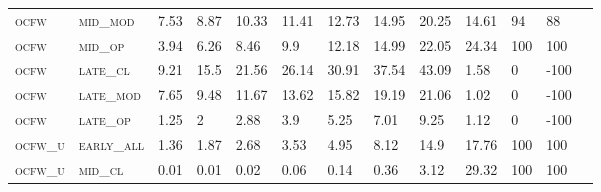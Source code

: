 \begin{sidewaystable}[!htbp]
\begin{tabular}{@{}lllllllllllll@{}}
\footnotesize \textsc{ocfw}        & \footnotesize \textsc{mid\_mod  }                & \footnotesize 7.53            & \footnotesize 8.87            & \footnotesize 10.33            & \footnotesize 11.41            & \footnotesize 12.73            & \footnotesize 14.95            & \footnotesize 20.25      & \footnotesize 14.61    & \footnotesize 94     & \footnotesize 88       \\
\footnotesize \textsc{ocfw}        & \footnotesize \textsc{mid\_op   }                & \footnotesize 3.94            & \footnotesize 6.26            & \footnotesize 8.46             & \footnotesize 9.9              & \footnotesize 12.18            & \footnotesize 14.99            & \footnotesize 22.05      & \footnotesize 24.34    & \footnotesize 100    & \footnotesize 100      \\
\footnotesize \textsc{ocfw}        & \footnotesize \textsc{late\_cl  }                & \footnotesize 9.21            & \footnotesize 15.5            & \footnotesize 21.56            & \footnotesize 26.14            & \footnotesize 30.91            & \footnotesize 37.54            & \footnotesize 43.09      & \footnotesize 1.58     & \footnotesize 0      & \footnotesize -100     \\
\footnotesize \textsc{ocfw}        & \footnotesize \textsc{late\_mod }                & \footnotesize 7.65            & \footnotesize 9.48            & \footnotesize 11.67            & \footnotesize 13.62            & \footnotesize 15.82            & \footnotesize 19.19            & \footnotesize 21.06      & \footnotesize 1.02     & \footnotesize 0      & \footnotesize -100     \\
\footnotesize \textsc{ocfw}        & \footnotesize \textsc{late\_op  }                & \footnotesize 1.25            & \footnotesize 2               & \footnotesize 2.88             & \footnotesize 3.9              & \footnotesize 5.25             & \footnotesize 7.01             & \footnotesize 9.25       & \footnotesize 1.12     & \footnotesize 0      & \footnotesize -100     \\
\footnotesize \textsc{ocfw\_u}     & \footnotesize \textsc{early\_all}                & \footnotesize 1.36            & \footnotesize 1.87            & \footnotesize 2.68             & \footnotesize 3.53             & \footnotesize 4.95             & \footnotesize 8.12             & \footnotesize 14.9       & \footnotesize 17.76    & \footnotesize 100    & \footnotesize 100      \\
\footnotesize \textsc{ocfw\_u}     & \footnotesize \textsc{mid\_cl   }                & \footnotesize 0.01            & \footnotesize 0.01            & \footnotesize 0.02             & \footnotesize 0.06             & \footnotesize 0.14             & \footnotesize 0.36             & \footnotesize 3.12       & \footnotesize 29.32    & \footnotesize 100    & \footnotesize 100      \\

\end{tabular}
\end{sidewaystable}
